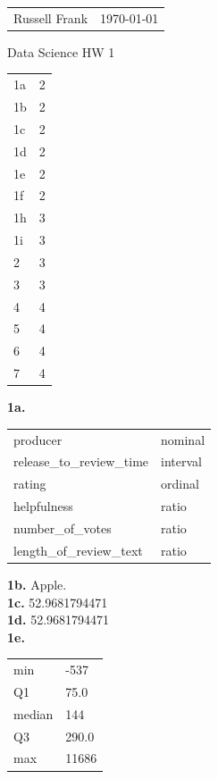\documentclass[10pt]{amsart}
\makeatletter
\newcommand{\head}[1]{
   \begin{tabular*}{7.1in}{@{}l@{\extracolsep{\fill}}r}
      Russell Frank & \today \\
   \end{tabular*}
   \begin{center} \LARGE #1 \normalsize \end{center}
   \vskip 0.1in
}
\makeatother
\begin{document}
\head{Data Science HW 1}

\begin{center}

\begin{tabular}{l|l}
  1a & 2 \\
  1b & 2 \\
  1c & 2 \\
  1d & 2 \\
  1e & 2 \\
  1f & 2 \\
  1h & 3 \\
  1i & 3 \\
  2 & 3 \\
  3 & 3 \\
  4 & 4 \\
  5 & 4 \\
  6 & 4 \\
  7 & 4 \\
\end{tabular}

\end{center}

\newpage

\textbf{1a.}

\begin{tabular}{ll}
  producer & nominal \\
  release\_to\_review\_time & interval \\
  rating & ordinal \\
  helpfulness & ratio \\
  number\_of\_votes & ratio \\
  length\_of\_review\_text & ratio \\
\end{tabular}

\textbf{1b.} Apple. \\

\textbf{1c.} 52.9681794471 \\

\textbf{1d.} 52.9681794471 \\

\textbf{1e.} 

\begin{tabular}{ll}
  min & -537 \\
  Q1 & 75.0 \\
  median & 144 \\
  Q3 & 290.0 \\
  max & 11686 \\
\end{tabular}
\end{document}
